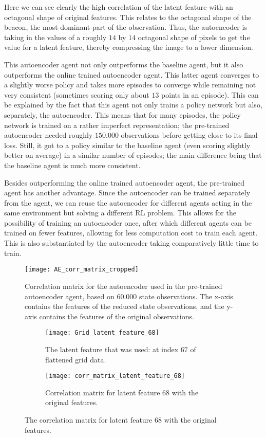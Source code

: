 Here we can see clearly the high correlation of the latent feature with an octagonal shape of original features. This relates to the octagonal shape of the beacon, the most dominant part of the observation. Thus, the autoencoder is taking in the values of a roughly $14$ by $14$ octagonal shape of pixels to get the value for a latent feature, thereby compressing the image to a lower dimension.

This autoencoder agent not only outperforms the baseline agent, but it also outperforms the online trained autoencoder agent. This latter agent converges to a slightly worse policy and takes more episodes to converge while remaining not very consistent (sometimes scoring only about $13$ points in an episode). This can be explained by the fact that this agent not only trains a policy network but also, separately, the autoencoder. This means that for many episodes, the policy network is trained on a rather imperfect representation; the pre-trained autoencoder needed roughly $150.000$ observations before getting close to its final loss. Still, it got to a policy similar to the baseline agent (even scoring slightly better on average) in a similar number of episodes; the main difference being that the baseline agent is much more consistent.

Besides outperforming the online trained autoencoder agent, the pre-trained agent has another advantage. Since the autoencoder can be trained separately from the agent, we can reuse the autoencoder for different agents acting in the same environment but solving a different RL problem. This allows for the possibility of training an autoencoder once, after which different agents can be trained on fewer features, allowing for less computation cost to train each agent. This is also substantiated by the autoencoder taking comparatively little time to train.


\begin{figure}[h]
	\centering
	\texttt{[image: AE\_corr\_matrix\_cropped]}
	\caption{Correlation matrix for the autoencoder used in the pre-trained autoencoder agent, based on $60.000$ state observations. The x-axis contains the features of the reduced state observations, and the y-axis contains the features of the original observations.}
	\label{fig:ae-corr}
\end{figure}

\begin{figure}[h]
	\centering
	\begin{subfigure}[b]{0.2\textwidth}
		\texttt{[image: Grid\_latent\_feature\_68]}
		\caption{The latent feature that was used: at index $67$ of flattened grid data.}
		\label{fig:ae-latent-feature} 
	\end{subfigure}\hfill
	\begin{subfigure}[b]{0.75\textwidth}
		\texttt{[image: corr\_matrix\_latent\_feature\_68]}
		\caption{Correlation matrix for latent feature $68$ with the original features.}
		\label{fig:ae-latent-feature-corr-matrix}
	\end{subfigure}
	\caption{The correlation matrix for latent feature $68$ with the original features.}
	\label{fig:latent-feature-corr}
\end{figure}

